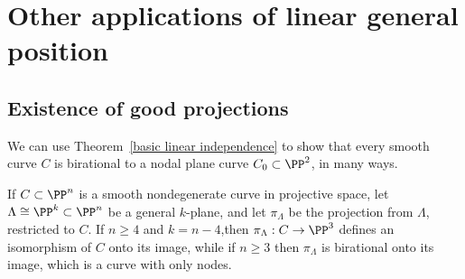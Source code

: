\section{Other applications of linear general position}

\subsection{Existence of good projections}\label{projection section}\label{good projections}

We can use Theorem~\ref{basic linear independence} to show that every smooth curve $C$ is birational to a nodal plane curve $C_0 \subset \PP^2$, in many ways.

\begin{proposition}\label{nodal projection}
If $C \subset \PP^n$ is a smooth nondegenerate curve in projective space, let $\Lambda \cong \PP^{k} \subset \PP^n$ be a general $k$-plane, and let
$\pi_\Lambda$ be the projection from $\Lambda$, restricted to $C$. If $n\geq 4$ and $k=n-4$,then
$\pi_\Lambda: C \to \PP^3$ defines an isomorphism of $C$ onto its image, while if $n\geq 3$ then $\pi_\Lambda$ is birational onto its image, which is a curve with only nodes.
\end{proposition}

